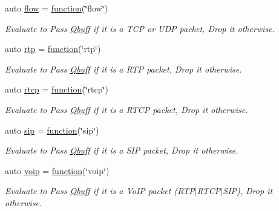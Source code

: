 \begin{DoxyCompactItemize}
auto \hyperlink{namespacepfq_1_1lang_1_1anonymous__namespace_02default_8hpp_03_af6c7518847c8c960b0e98cd856871a1b}{flow} = \hyperlink{namespacepfq_1_1lang_a1a4638059d700ae08d0ca63886ff2bb3}{function}(\char`\"{}flow\char`\"{})
\begin{DoxyCompactList}\small\item\em Evaluate to {\ttfamily Pass} \hyperlink{structpfq_1_1lang_1_1Qbuff}{Qbuff} if it is a T\+CP or U\+DP packet, {\ttfamily Drop} it otherwise. \end{DoxyCompactList}\item 
auto \hyperlink{namespacepfq_1_1lang_1_1anonymous__namespace_02default_8hpp_03_aa8ac230fe8eeb0bccee8e31ba032cb8e}{rtp} = \hyperlink{namespacepfq_1_1lang_a1a4638059d700ae08d0ca63886ff2bb3}{function}(\char`\"{}rtp\char`\"{})
\begin{DoxyCompactList}\small\item\em Evaluate to {\ttfamily Pass} \hyperlink{structpfq_1_1lang_1_1Qbuff}{Qbuff} if it is a R\+TP packet, {\ttfamily Drop} it otherwise. \end{DoxyCompactList}\item 
auto \hyperlink{namespacepfq_1_1lang_1_1anonymous__namespace_02default_8hpp_03_ad16ac0dfb9ae7abc1db76ab8041bada3}{rtcp} = \hyperlink{namespacepfq_1_1lang_a1a4638059d700ae08d0ca63886ff2bb3}{function}(\char`\"{}rtcp\char`\"{})
\begin{DoxyCompactList}\small\item\em Evaluate to {\ttfamily Pass} \hyperlink{structpfq_1_1lang_1_1Qbuff}{Qbuff} if it is a R\+T\+CP packet, {\ttfamily Drop} it otherwise. \end{DoxyCompactList}\item 
auto \hyperlink{namespacepfq_1_1lang_1_1anonymous__namespace_02default_8hpp_03_a3ac0338626e771b43b200663e095aa36}{sip} = \hyperlink{namespacepfq_1_1lang_a1a4638059d700ae08d0ca63886ff2bb3}{function}(\char`\"{}sip\char`\"{})
\begin{DoxyCompactList}\small\item\em Evaluate to {\ttfamily Pass} \hyperlink{structpfq_1_1lang_1_1Qbuff}{Qbuff} if it is a S\+IP packet, {\ttfamily Drop} it otherwise. \end{DoxyCompactList}\item 
auto \hyperlink{namespacepfq_1_1lang_1_1anonymous__namespace_02default_8hpp_03_a814df3093ef905eedf9a9add4c625147}{voip} = \hyperlink{namespacepfq_1_1lang_a1a4638059d700ae08d0ca63886ff2bb3}{function}(\char`\"{}voip\char`\"{})
\begin{DoxyCompactList}\small\item\em Evaluate to {\ttfamily Pass} \hyperlink{structpfq_1_1lang_1_1Qbuff}{Qbuff} if it is a Vo\+IP packet (R\+T\+P$\vert$\+R\+T\+C\+P$\vert$\+S\+IP), {\ttfamily Drop} it otherwise. \end{DoxyCompactList}\item 

\end{DoxyCompactItemize}
